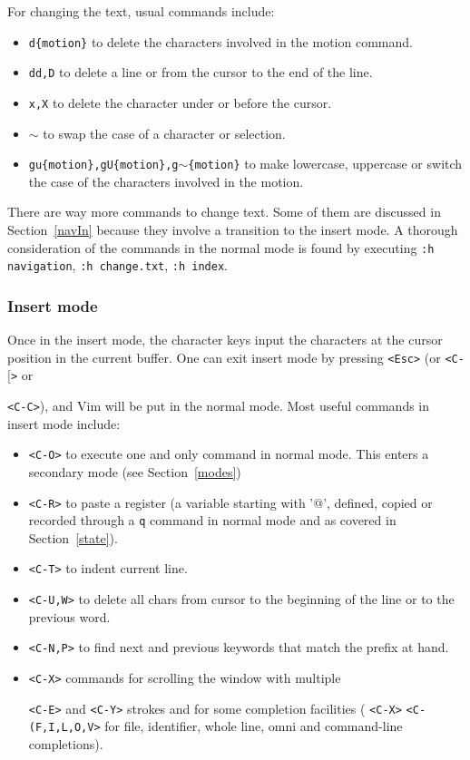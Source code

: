 \documentclass{article}
\newcommand{\ttt}[1] {
	\texttt{<#1>}}
\newcommand{\tttt}[1]{\texttt{#1}}
\begin{document}
For changing the text, usual commands include:
\begin{itemize}
  \item \texttt{d\{motion\}} to delete the characters
    involved in the motion command.
  \item \texttt{dd,D} to delete a line or from the cursor to the end of the line.
  \item \texttt{x,X} to delete the character under or before the cursor.
  \item \texttt{$\sim$} to swap the case of a character or selection.
  \item \texttt{gu\{motion\},gU\{motion\},g$\sim$\{motion\}} to make lowercase, uppercase or switch the case of the characters involved in the motion.
\end{itemize}

There are way more commands to change text.
Some of them are discussed in Section~\ref{navIn}
because they involve a transition to the insert mode.
A thorough consideration of the commands in the normal mode
is found by executing \texttt{:h navigation}, 
\texttt{:h change.txt}, \tttt{:h index}.

\subsubsection{Insert mode}\label{sec:ins}
Once in the insert mode, the character keys
input the characters at the cursor position in the current buffer.
One can exit insert mode by pressing \texttt{<Esc>} (or \ttt{C-$[$} or
\ttt{C-C}),
and Vim will be put in the normal mode.
Most useful commands in insert mode include:
\begin{itemize}
  \item \ttt{C-O} to execute one and only command in normal mode.
	  This enters a secondary mode (see Section~\ref{modes})
  \item \ttt{C-R} to paste a register (a variable starting with
    '@', defined, copied or recorded through a \tttt{q} command in
    normal mode and as covered in Section~\ref{state}).
  \item \ttt{C-T} to indent current line.
  \item \ttt{C-U,W} to delete all chars from cursor to the beginning of
    the line or to the previous word.
  \item \ttt{C-N,P} to find next and previous keywords that match the prefix at hand.
  \item \ttt{C-X} commands for scrolling the window with multiple
    \ttt{C-E} and \ttt{C-Y} strokes and for some completion facilities
    (\ttt{C-X}\ttt{C-(F,I,L,O,V} for file, identifier, whole line, omni and command-line completions). 
\end{itemize}
\end{document}
